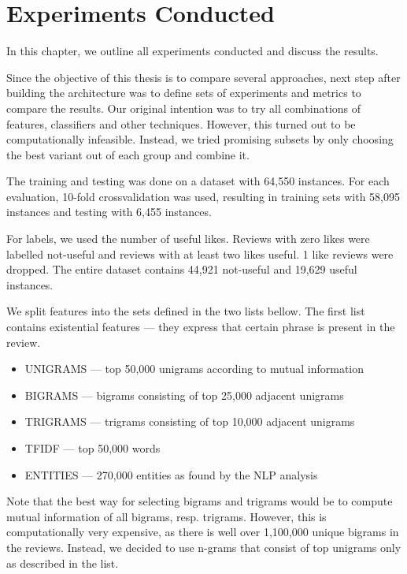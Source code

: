 \chapter{Experiments Conducted}\label{chap:exp}

In this chapter, we outline all experiments conducted and discuss the results.

Since the objective of this thesis is to compare several approaches,
next step after building the architecture was to define sets of experiments and metrics to compare the results.
Our original intention was to try all combinations of features, classifiers and other techniques.
However, this turned out to be computationally infeasible.
Instead, we tried promising subsets by only choosing the best variant out of each group and combine it.

The training and testing was done on a dataset with 64,550 instances.
For each evaluation, 10-fold crossvalidation was used, resulting in
training sets with 58,095 instances and testing with 6,455 instances.

For labels, we used the number of useful likes.
Reviews with zero likes were labelled not-useful and
reviews with at least two likes useful.
1 like reviews were dropped.
The entire dataset contains 44,921 not-useful and
19,629 useful instances.

We split features into the sets defined in the two lists bellow.
The first list contains existential features --- they express that certain phrase is present in the review.

\begin{itemize}
	\item UNIGRAMS --- top 50,000 unigrams according to mutual information
	\item BIGRAMS --- bigrams consisting of top 25,000 adjacent unigrams
	\item TRIGRAMS  --- trigrams consisting of top 10,000 adjacent unigrams
	\item TFIDF  --- top 50,000 words
	\item ENTITIES --- 270,000 entities as found by the NLP analysis
\end{itemize}

Note that the best way for selecting bigrams and trigrams would be to compute mutual information of all bigrams, resp. trigrams.
However, this is computationally very expensive, as there is well over 1,100,000 unique bigrams in the reviews.
Instead, we decided to use n-grams that consist of top unigrams only as described in the list.

